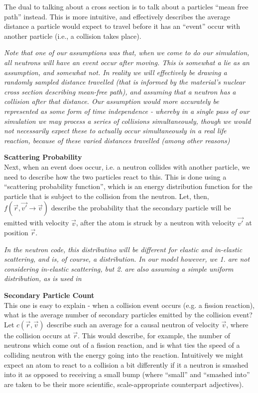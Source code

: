 The dual to talking about a cross section is to talk about a particles ``mean free path'' instead. This is more intuitive, and 
effectively describes the average distance a particle would expect to travel before it has an ``event'' occur with another 
particle (i.e., a collision takes place). 

\textit{Note that one of our assumptions was that, when we come to do our simulation, all neutrons will have an event occur 
after moving. This is somewhat a lie as an assumption, and somewhat not. In reality we will effectively be drawing a randomly 
sampled distance travelled (that is informed by the material's nuclear cross section describing mean-free path), and assuming that 
a neutron has a collision after that distance. Our assumption would more accurately be represented as some form of time independence 
- whereby in a single pass of our simulation we may process a series of collisions simultaneously, though we would not 
necessarily expect these to actually occur simultaneously in a real life reaction, because of these varied distances travelled (among 
other reasons)}

\noindent \textbf{Scattering Probability}\\
Next, when an event does occur, i.e. a neutron collides with another particle, we need to describe how the two 
particles react to this. This is done using a ``scattering probability function'', which is an energy distribution function 
for the particle that is subject to the collision from the neutron. Let, then, $f(\vec{r}, \vec{v'} \to \vec{v})$ describe the 
probability that the secondary particle will be emitted with velocity $\vec{v}$, after the atom is struck by a neutron with 
velocity $\vec{v'}$ at position $\vec{r}$. 

\textit{In the neutron code, this distributino will be different for elastic and in-elastic scattering, and is, of course, 
a distribution. In our model however, we 1. are not considering in-elastic scattering, but 2. are also assuming a simple 
uniform distribution, as is used in \cite{simulations-neutron-transport} }

\noindent \textbf{Secondary Particle Count}\\
This one is easy to explain - when a collision event occurs (e.g. a fission reaction), what is the average number of secondary particles 
emitted by the collision event? Let $c(\vec{r}, \vec{v})$ describe such an average for a causal neutron of velocity $\vec{v}$, where 
the collision occurs at $\vec{r}$. This would describe, for example, the number of neutrons which come out of a fission reaction, and 
is what ties the speed of a colliding neutron with the energy going into the reaction. Intuitively we might expect an atom to react 
to a collision a bit differently if it a neutron is smashed into it as opposed to receiving a small bump (where ``small'' and 
``smashed into'' are taken to be their more scientific, scale-appropriate counterpart adjectives).

